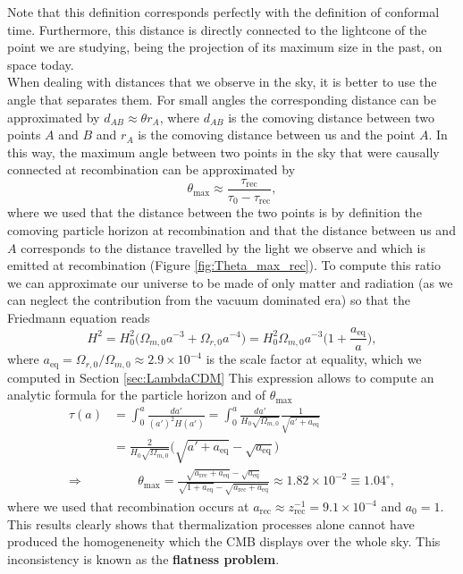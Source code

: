 Note that this definition corresponds perfectly with the definition of conformal time. Furthermore, this distance is directly connected to the lightcone of the point we are studying, being the projection of its maximum size in the past, on space today. \\When dealing with distances that we observe in the sky, it is better to use the angle that separates them. For small angles the corresponding distance can be approximated by $d_{AB}\approx \theta r_{A}$, where $d_{AB}$ is the comoving distance between two points $A$ and $B$ and $r_A$ is the comoving distance between us and the point $A$. In this way, the maximum angle between two points in the sky that were causally connected at recombination can be approximated by
$$\theta_\text{max}\approx\frac{\tau_\text{rec}}{\tau_0-\tau_\text{rec}},$$
where we used that the distance between the two points is by definition the comoving particle horizon at recombination and that the distance between us and $A$ corresponds to the distance travelled by the light we observe and which is emitted at recombination (Figure \ref{fig:Theta_max_rec}). To compute this ratio we can approximate our universe to be made of only matter and radiation (as we can neglect the contribution from the vacuum dominated era) so that the Friedmann equation reads
$$H^2=H_0^2\big(\Omega_{m,0}a^{-3}+\Omega_{r,0}a^{-4}\big)=H_0^2\Omega_{m,0}a^{-3}\bigg(1+\frac{a_\text{eq}}{a}\bigg),
$$
where $a_\text{eq}=\Omega_{r,0}/\Omega_{m,0}\approx2.9\times10^{-4}$ is the scale factor at equality, which we computed in Section \ref{sec:LambdaCDM}  
This expression allows to compute an analytic formula for the particle horizon and of $\theta_\text{max}$
\begin{align*}
    \tau(a)&=\int_0^a \frac{da'}{(a')^2H(a')}=\int_0^a\frac{da'}{H_0\sqrt{\Omega_{m,0}}}\frac{1}{\sqrt{a'+a_\text{eq}}}\\
    &=\frac{2}{H_0\sqrt{\Omega_{m,0}}}\Big(\sqrt{a'+a_\text{eq}}-\sqrt{a_\text{eq}}\Big)\\
    \Rightarrow &\qquad \theta_\text{max}=\frac{\sqrt{a_{\text{rec}}+a_{\text{eq}}}-\sqrt{a_{\text{eq}}}}{\sqrt{1+a_\text{eq}}-\sqrt{a_\text{rec}+a_\text{eq}}}\approx1.82 \times 10^{-2}\equiv 1.04 ^\circ,
\end{align*}
where we used that recombination occurs at $a_\text{rec}\approx z_\text{rec}^{-1}= 9.1\times 10^{-4}$ and $a_0=1$.
This results clearly shows that thermalization processes alone cannot have produced the homogeneneity which the CMB displays over the whole sky. This inconsistency is known as the \textbf{flatness problem}.

